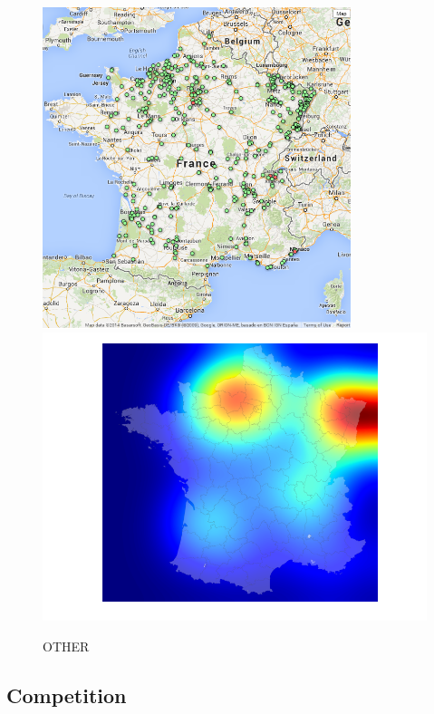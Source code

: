\documentclass[11pt]{article}
\begin{document}
\begin{figure}[H]
    \caption{OTHER}
	\centering
		\includegraphics[width=9cm]{images/maps_group_dots/AUTRE.png}
        \includegraphics[width=12.8cm]{images/maps_group_heatmaps/AUTRE.png}
\end{figure}

\subsection{Competition}
\end{document}
